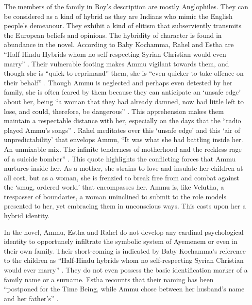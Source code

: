 The members of the family in Roy's description are mostly Anglophiles. They can be considered as a kind of hybrid as they are Indians who mimic the English people's demeanour. They exhibit a kind of elitism that subserviently transmits the European beliefs and opinions. The hybridity of character is found in abundance in the novel. According to Baby Kochamma, Rahel and Estha are ``Half-Hindu Hybrids whom no self-respecting Syrian Christian would even marry'' \parencite[44]{Roy1997}. Their vulnerable footing makes Ammu vigilant towards them, and though she is ``quick to reprimand'' them, she is ``even quicker to take offence on their behalf'' \parencite[42]{Roy1997}. Though Ammu is neglected and perhaps even detested by her family, she is often feared by them because they can anticipate an `unsafe edge' about her, being ``a woman that they had already damned, now had little left to lose, and could, therefore, be dangerous'' \parencite[44]{Roy1997}. This apprehension makes them maintain a respectable distance with her, especially on the days that the ``radio played Ammu's songs'' \parencite[44]{Roy1997}. Rahel meditates over this `unsafe edge' and this `air of unpredictability' that envelops Ammu, ``It was what she had battling inside her. An unmixable mix. The infinite tenderness of motherhood and the reckless rage of a suicide bomber'' \parencite[44]{Roy1997}. This quote highlights the conflicting forces that Ammu nurtures inside her. As a mother, she strains to love and insulate her children at all cost, but as a woman, she is frenzied to break free from and combat against the `smug, ordered world' that encompasses her. Ammu is, like Velutha, a trespasser of boundaries, a woman uninclined to submit to the role models presented to her, yet embracing them in unconscious ways. This casts upon her a hybrid identity.   

In the novel, Ammu, Estha and Rahel do not develop any cardinal psychological identity to opportunely infiltrate the symbolic system of Ayemenem or even in their own family. Their short-coming is indicated by Baby Kochamma's reference to the children as ``Half-Hindu hybrids whom no self-respecting Syrian Christian would ever marry'' \parencite[45]{Roy1997}. They do not even possess the basic identification marker of a family name or a surname. Estha recounts that their naming has been ``postponed for the Time Being, while Ammu chose between her husband's name and her father's'' \parencite[150]{Roy1997}.

